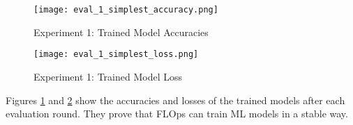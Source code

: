 \begin{figure}[h]
    \centering
    \texttt{[image: eval\_1\_simplest\_accuracy.png]}
    \caption{Experiment 1: Trained Model Accuracies}
    \label{fig:eval_1_simplest_accuracies}
\end{figure}

\begin{figure}[h]
    \centering
    \texttt{[image: eval\_1\_simplest\_loss.png]}
    \caption{Experiment 1: Trained Model Loss}
    \label{fig:eval_1_simplest_loss}
\end{figure}

Figures \ref{fig:eval_1_simplest_accuracies} and \ref{fig:eval_1_simplest_loss} show the accuracies and losses of the trained models after each evaluation round.
They prove that FLOps can train ML models in a stable way.